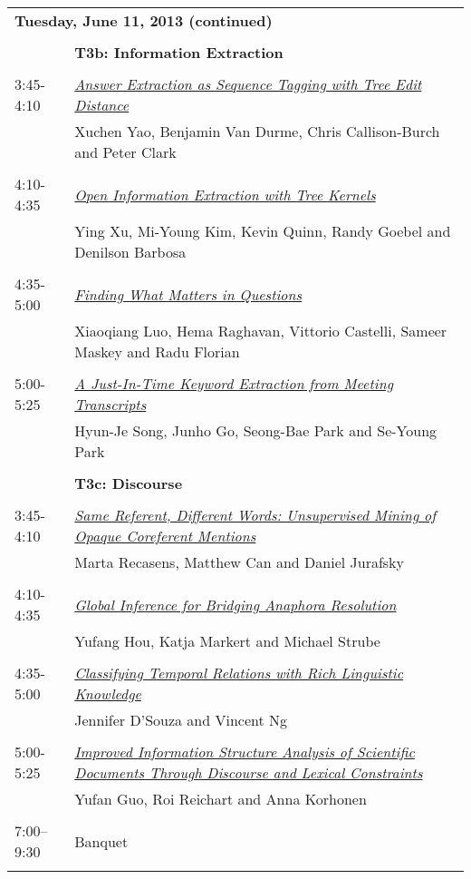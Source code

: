 \newpage
\begin{tabular}{p{20mm}p{138mm}}
\\
\multicolumn{2}{l}{\bf Tuesday, June 11, 2013
 (continued)} \\\\
 & {\bf T3b: Information Extraction
} \\
\\
3:45-4:10 & \hyperlink{page.858}{\em Answer Extraction as Sequence Tagging with Tree Edit Distance}\\
         & Xuchen Yao, Benjamin Van Durme, Chris Callison-Burch and Peter Clark \\
\\

4:10-4:35 & \hyperlink{page.868}{\em Open Information Extraction with Tree Kernels}\\
         & Ying Xu, Mi-Young Kim, Kevin Quinn, Randy Goebel and Denilson Barbosa \\
\\

4:35-5:00 & \hyperlink{page.878}{\em Finding What Matters in Questions}\\
         & Xiaoqiang Luo, Hema Raghavan, Vittorio Castelli, Sameer Maskey and Radu Florian \\
\\

5:00-5:25 & \hyperlink{page.888}{\em A Just-In-Time Keyword Extraction from Meeting Transcripts}\\
         & Hyun-Je Song, Junho Go, Seong-Bae Park and Se-Young Park \\
\\

 & {\bf T3c: Discourse
} \\
\\
3:45-4:10 & \hyperlink{page.897}{\em Same Referent, Different Words: Unsupervised Mining of Opaque Coreferent Mentions}\\
         & Marta Recasens, Matthew Can and Daniel Jurafsky \\
\\

4:10-4:35 & \hyperlink{page.907}{\em Global Inference for Bridging Anaphora Resolution}\\
         & Yufang Hou, Katja Markert and Michael Strube \\
\\

4:35-5:00 & \hyperlink{page.918}{\em Classifying Temporal Relations with Rich Linguistic Knowledge}\\
         & Jennifer D'Souza and Vincent Ng \\
\\

5:00-5:25 & \hyperlink{page.928}{\em Improved Information Structure Analysis of Scientific Documents Through Discourse and Lexical Constraints}\\
         & Yufan Guo, Roi Reichart and Anna Korhonen \\
\\

7:00--9:30 & Banquet
 \\
\\
\end{tabular}
